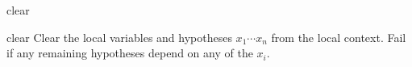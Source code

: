 \begin{tactic}{clear}
  \begin{tsyntax}[empty]{clear}
  Clear the local variables and hypotheses $x_1 \cdots x_n$ from the
  local context. Fail if any remaining hypotheses depend on any of the
  $x_i$.
  \end{tsyntax}
\end{tactic}
